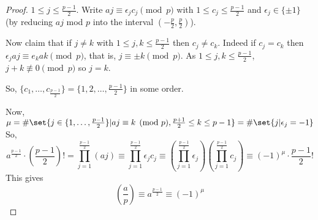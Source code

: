 \documentclass{article}
\newcommand{\legendre}[2]{\genfrac{(}{)}{}{}{#1}{#2}}
\begin{document}
\begin{proof}
    $1 \leq j \leq \frac{p-1}{2}$. Write $aj \equiv \epsilon_j c_j \pmod{p}$ with $1 \leq c_j \leq \frac{p-1}{2}$ and $\epsilon_j \in \{\pm 1\}$ (by reducing $aj$ mod $p$ into the interval $(-\frac{p}{2}, \frac{p}{2})$).

    Now claim that if $j \neq k$ with $1 \leq j, k \leq \frac{p-1}{2}$ then $c_j \neq c_k$. Indeed if $c_j = c_k$ then $\epsilon_j aj \equiv e_k ak \pmod{p}$, that is, $j \equiv \pm k \pmod{p}$.
    As $1 \leq j, k \leq \frac{p-1}{2}$, $j + k \not\equiv 0 \pmod{p}$ so $j = k$.

    So, $\{c_1, \dotsc, c_{\frac{p-1}{2}}\} = \{1, 2, \dotsc, \frac{p-1}{2}\}$ in some order.

    Now, $\mu = \#\set{j \in \{1, \dotsc, \frac{p-1}{2}\} | aj \equiv k \pmod{p}, \frac{p+1}{2} \leq k \leq p-1} = \#\set{j | \epsilon_j = -1}$
    So,
    \begin{equation*}
        a^{\frac{p-1}{2}} \cdot \left(\frac{p-1}{2}\right)!
        = \prod_{j=1}^{\frac{p-1}{2}} (aj)
        \equiv \prod_{j=1}^{\frac{p-1}{2}} \epsilon_j c_j
        \equiv \left(\prod_{j=1}^{\frac{p-1}{2}} \epsilon_j \right) \left(\prod_{j=1}^{\frac{p-1}{2}} c_j \right)
        \equiv (-1)^\mu \cdot \frac{p-1}{2}!
    \end{equation*}
    This gives
    \begin{equation*}
        \legendre{a}{p} \equiv a^{\frac{p-1}{2}} \equiv (-1)^\mu
    \end{equation*}
\end{proof}
\end{document}
